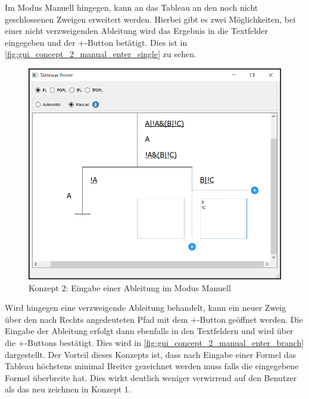 Im Modus Manuell hingegen, kann an das Tableau an den noch nicht geschlossenen Zweigen erweitert werden. Hierbei gibt es zwei Möglichkeiten, bei einer nicht verzweigenden Ableitung wird das Ergebnis in die Textfelder eingegeben und der +-Button betätigt. Dies ist in \autoref{fig:gui_concept_2_manual_enter_single} zu sehen.
\begin{figure}[h]
\begin{center}
\includegraphics[scale=0.7]{images/gui_concept_2_manual_enter_single.png}
\caption{Konzept 2: Eingabe einer Ableitung im Modus Manuell}
\label{fig:gui_concept_2_manual_enter_single}
\end{center}
\end{figure}

Wird hingegen eine verzweigende Ableitung behandelt, kann ein neuer Zweig über den nach Rechts angedeuteten Pfad mit dem +-Button geöffnet werden. Die Eingabe der Ableitung erfolgt dann ebenfalls in den Textfeldern und wird über die +-Buttons bestätigt. Dies wird in \autoref{fig:gui_concept_2_manual_enter_branch} dargestellt. Der Vorteil dieses Konzepts ist, dass nach Eingabe einer Formel das Tableau höchstens minimal Breiter gezeichnet werden muss falls die eingegebene Formel überbreite hat. Dies wirkt deutlich weniger verwirrend auf den Benutzer als das neu zeichnen in Konzept 1.

